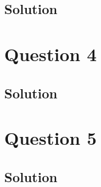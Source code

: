 \documentclass[a4paper, 10pt]{article}
\begin{document}
    \subsection{Solution}


  \section{Question 4}
    \subsection{Solution}

  \section{Question 5}
    \subsection{Solution}


\end{document}
